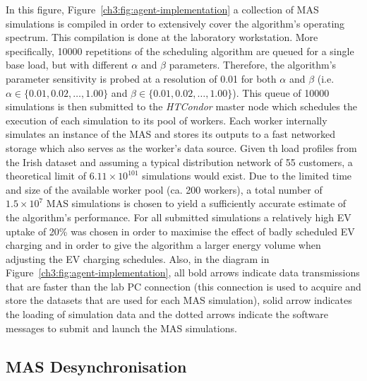 In this figure, Figure~\ref{ch3:fig:agent-implementation} a collection of MAS simulations is compiled in order to extensively cover the algorithm's operating spectrum.
This compilation is done at the laboratory workstation.
More specifically, 10000 repetitions of the scheduling algorithm are queued for a single base load, but with different $\alpha$ and $\beta$ parameters.
Therefore, the algorithm's parameter sensitivity is probed at a resolution of 0.01 for both $\alpha$ and $\beta$ (i.e. $\alpha \in \{0.01, 0.02, \dots, 1.00\}$ and $\beta \in \{0.01, 0.02, \dots, 1.00\}$).
This queue of 10000 simulations is then submitted to the \textit{HTCondor} master node which schedules the execution of each simulation to its pool of workers.
Each worker internally simulates an instance of the MAS and stores its outputs to a fast networked storage which also serves as the worker's data source.
\cite{IrishData2002}
Given th load profiles from the Irish dataset\hladd{,} and assuming a typical distribution network of 55 customers, a theoretical limit of $6.11\times10^{101}$ simulations would exist.
Due to the limited time and size of the available worker pool (ca. 200 workers), a total number of $1.5\times10^{7}$ MAS simulations is chosen to yield a sufficiently accurate estimate of the algorithm's performance.
For all submitted simulations a relatively high EV uptake of 20\% was chosen in order to maximise the effect of badly scheduled EV charging and in order to give the algorithm a larger energy volume when adjusting the EV charging schedules.
Also, in the diagram in Figure~\ref{ch3:fig:agent-implementation}, all bold arrows indicate data transmissions that are faster than the lab PC connection (this connection is used to acquire and store the datasets that are used for each MAS simulation), solid arrow indicates the loading of simulation data and the dotted arrows indicate the software messages to submit and launch the MAS simulations.

\subsection{MAS Desynchronisation}
\label{ch3:subsec:desynchronisation}


